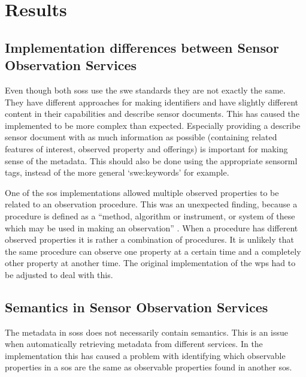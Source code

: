 
\chapter{Results}
\label{chap:results}

\section{Implementation differences between Sensor Observation Services}
Even though both \aclp{sos} use the \ac{swe} standards they are not exactly the same. They have different approaches for making identifiers and have slightly different content in their capabilities and describe sensor documents. This has caused the implemented to be more complex than expected. Especially providing a describe sensor document with as much information as possible (containing related features of interest, observed property and offerings) is important for making sense of the metadata. This should also be done using the appropriate \ac{sensorml} tags, instead of the more general `swe:keywords' for example. 

One of the \ac{sos} implementations allowed multiple observed properties to be related to an observation procedure. This was an unexpected finding, because a procedure is defined as a \enquote{method, algorithm or instrument, or system of these which may be used in making an observation} \cite[p. 4]{SW:ISO}. When a procedure has different observed properties it is rather a combination of procedures. It is unlikely that the same procedure can observe one property at a certain time and a completely other property at another time. The original implementation of the \ac{wps} had to be adjusted to deal with this.  

\section{Semantics in Sensor Observation Services}
The metadata in \aclp{sos} does not necessarily contain semantics. This is an issue when automatically retrieving metadata from different services. In the implementation this has caused a problem with identifying which observable properties in a \ac{sos} are the same as observable properties found in another \ac{sos}. 

